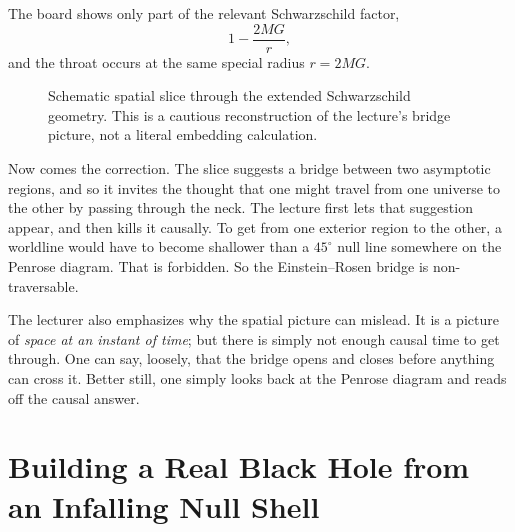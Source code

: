 The board shows only part of the relevant Schwarzschild factor,
\begin{equation}
1-\frac{2MG}{r},
\end{equation}
and the throat occurs at the same special radius \(r=2MG\).

\begin{figure}[htbp]
\centering
{}
\caption{Schematic spatial slice through the extended Schwarzschild geometry. This is a cautious reconstruction of the lecture's bridge picture, not a literal embedding calculation.}
\end{figure}

Now comes the correction. The slice suggests a bridge between two asymptotic regions, and so it invites the thought that one might travel from one universe to the other by passing through the neck. The lecture first lets that suggestion appear, and then kills it causally. To get from one exterior region to the other, a worldline would have to become shallower than a \(45^\circ\) null line somewhere on the Penrose diagram. That is forbidden. So the Einstein--Rosen bridge is non-traversable.

The lecturer also emphasizes why the spatial picture can mislead. It is a picture of \emph{space at an instant of time}; but there is simply not enough causal time to get through. One can say, loosely, that the bridge opens and closes before anything can cross it. Better still, one simply looks back at the Penrose diagram and reads off the causal answer.

\section{Building a Real Black Hole from an Infalling Null Shell}

